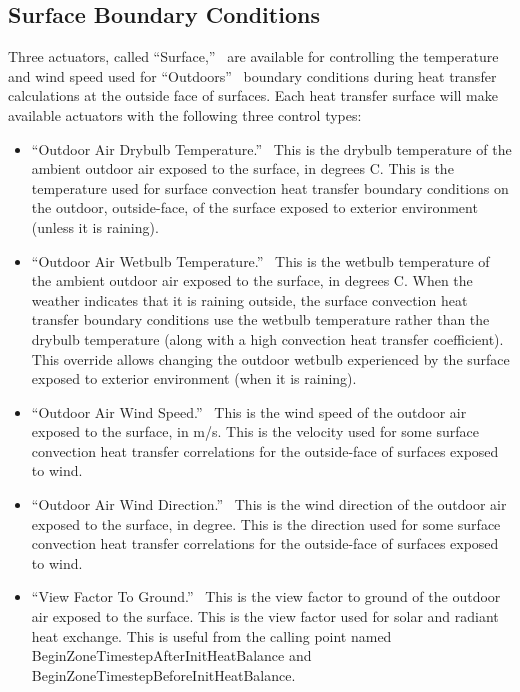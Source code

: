 \subsection{Surface Boundary Conditions}\label{surface-boundary-conditions}

Three actuators, called ``Surface,''~ are available for controlling the temperature and wind speed used for ``Outdoors''~ boundary conditions during heat transfer calculations at the outside face of surfaces. Each heat transfer surface will make available actuators with the following three control types:

\begin{itemize}
\item
  ``Outdoor Air Drybulb Temperature.''~ This is the drybulb temperature of the ambient outdoor air exposed to the surface, in degrees C. This is the temperature used for surface convection heat transfer boundary conditions on the outdoor, outside-face, of the surface exposed to exterior environment (unless it is raining).
\item
  ``Outdoor Air Wetbulb Temperature.''~ This is the wetbulb temperature of the ambient outdoor air exposed to the surface, in degrees C. When the weather indicates that it is raining outside, the surface convection heat transfer boundary conditions use the wetbulb temperature rather than the drybulb temperature (along with a high convection heat transfer coefficient). This override allows changing the outdoor wetbulb experienced by the surface exposed to exterior environment (when it is raining).
\item
  ``Outdoor Air Wind Speed.''~ This is the wind speed of the outdoor air exposed to the surface, in m/s. This is the velocity used for some surface convection heat transfer correlations for the outside-face of surfaces exposed to wind. 
\item
  ``Outdoor Air Wind Direction.''~ This is the wind direction of the outdoor air exposed to the surface, in degree. This is the direction used for some surface convection heat transfer correlations for the outside-face of surfaces exposed to wind.
\item
  ``View Factor To Ground.''~ This is the view factor to ground of the outdoor air exposed to the surface. This is the view factor used for solar and radiant heat exchange. This is useful from the calling point named BeginZoneTimestepAfterInitHeatBalance and BeginZoneTimestepBeforeInitHeatBalance.
\end{itemize}

